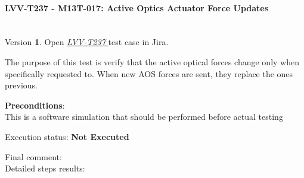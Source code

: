 \documentclass[SE,lsstdraft,STR,toc]{lsstdoc}
\begin{document}
\paragraph{ LVV-T237 - M13T-017: Active Optics Actuator Force Updates }\mbox{}\\

Version \textbf{1}.
Open  \href{https://jira.lsstcorp.org/secure/Tests.jspa#/testCase/LVV-T237}{\textit{ LVV-T237 } }
test case in Jira.

The purpose of this test is verify that the active optical forces change
only when specifically requested to. When new AOS forces are sent, they
replace the ones previous.

\textbf{ Preconditions}:\\
This is a software simulation that should be performed before actual
testing

Execution status: {\bf Not Executed }

Final comment:\\


Detailed steps results:
\end{document}
